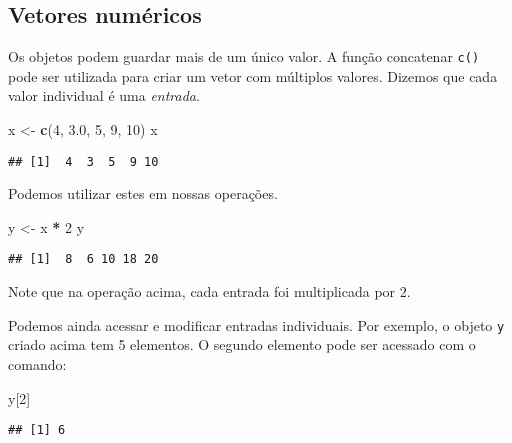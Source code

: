 \documentclass[
]{book}
\newenvironment{Shaded}{\begin{snugshade}}{\end{snugshade}}
\newcommand{\DecValTok}[1]{\textcolor[rgb]{0.00,0.00,0.81}{#1}}
\newcommand{\FloatTok}[1]{\textcolor[rgb]{0.00,0.00,0.81}{#1}}
\newcommand{\KeywordTok}[1]{\textcolor[rgb]{0.13,0.29,0.53}{\textbf{#1}}}
\newcommand{\NormalTok}[1]{#1}
\newcommand{\OperatorTok}[1]{\textcolor[rgb]{0.81,0.36,0.00}{\textbf{#1}}}
\newcommand{\StringTok}[1]{\textcolor[rgb]{0.31,0.60,0.02}{#1}}
\begin{document}
\hypertarget{vetores-numuxe9ricos}{%
\subsection{Vetores numéricos}\label{vetores-numuxe9ricos}}

Os objetos podem guardar mais de um único valor. A função concatenar \texttt{c()} pode ser utilizada para criar um vetor com múltiplos valores. Dizemos que cada valor individual é uma \emph{entrada}.

\begin{Shaded}
\begin{Highlighting}[]
\NormalTok{x <-}\StringTok{ }\KeywordTok{c}\NormalTok{(}\DecValTok{4}\NormalTok{, }\FloatTok{3.0}\NormalTok{, }\DecValTok{5}\NormalTok{, }\DecValTok{9}\NormalTok{, }\DecValTok{10}\NormalTok{)}
\NormalTok{x}
\end{Highlighting}
\end{Shaded}

\begin{verbatim}
## [1]  4  3  5  9 10
\end{verbatim}

Podemos utilizar estes em nossas operações.

\begin{Shaded}
\begin{Highlighting}[]
\NormalTok{y <-}\StringTok{ }\NormalTok{x }\OperatorTok{*}\StringTok{ }\DecValTok{2}
\NormalTok{y}
\end{Highlighting}
\end{Shaded}

\begin{verbatim}
## [1]  8  6 10 18 20
\end{verbatim}

Note que na operação acima, cada entrada foi multiplicada por \(2\).

Podemos ainda acessar e modificar entradas individuais. Por exemplo, o objeto \texttt{y} criado acima tem 5 elementos. O segundo elemento pode ser acessado com o comando:

\begin{Shaded}
\begin{Highlighting}[]
\NormalTok{y[}\DecValTok{2}\NormalTok{]}
\end{Highlighting}
\end{Shaded}

\begin{verbatim}
## [1] 6
\end{verbatim}
\end{document}
